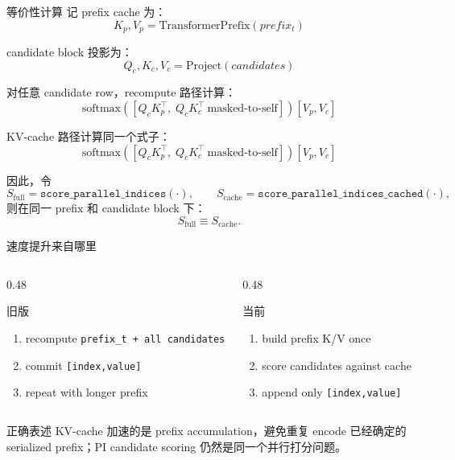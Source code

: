 \documentclass[aspectratio=169,10pt]{ctexbeamer}
\begin{document}
\begin{frame}{等价性计算}
  记 prefix cache 为：
  \[
    K_p,V_p = \mathrm{TransformerPrefix}(prefix_t)
  \]

  candidate block 投影为：
  \[
    Q_c,K_c,V_c = \mathrm{Project}(candidates)
  \]

  对任意 candidate row，recompute 路径计算：
  \[
    \mathrm{softmax}\left([Q_cK_p^\top,\; Q_cK_c^\top\ \text{masked-to-self}]\right)[V_p,V_c]
  \]

  KV-cache 路径计算同一个式子：
  \[
    \mathrm{softmax}\left([Q_cK_p^\top,\; Q_cK_c^\top\ \text{masked-to-self}]\right)[V_p,V_c]
  \]

  因此，令
  \[
    S_{\mathrm{full}}=\texttt{score\_parallel\_indices}(\cdot),\qquad
    S_{\mathrm{cache}}=\texttt{score\_parallel\_indices\_cached}(\cdot),
  \]
  则在同一 prefix 和 candidate block 下：
  \[
    S_{\mathrm{full}} \equiv S_{\mathrm{cache}}.
  \]
\end{frame}

\begin{frame}{速度提升来自哪里}
  \begin{columns}[T,onlytextwidth]
    \begin{column}{0.48\textwidth}
      \begin{block}{旧版}
        \begin{enumerate}
          \item recompute \texttt{prefix\_t + all candidates}
          \item commit \texttt{[index,value]}
          \item repeat with longer prefix
        \end{enumerate}
      \end{block}
    \end{column}
    \begin{column}{0.48\textwidth}
      \begin{block}{当前}
        \begin{enumerate}
          \item build prefix K/V once
          \item score candidates against cache
          \item append only \texttt{[index,value]}
        \end{enumerate}
      \end{block}
    \end{column}
  \end{columns}

  \vspace{0.7em}
  \begin{alertblock}{正确表述}
    KV-cache 加速的是 prefix accumulation，避免重复 encode 已经确定的 serialized prefix；PI candidate scoring 仍然是同一个并行打分问题。
  \end{alertblock}
\end{frame}
\end{document}
